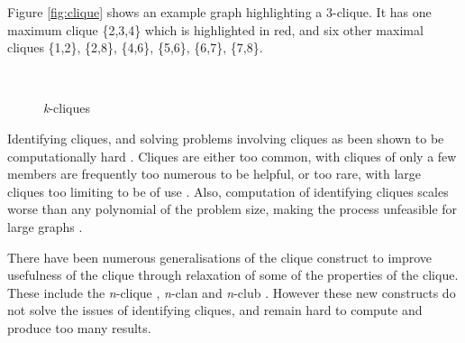 Figure \ref{fig:clique} shows an example graph highlighting a 3-clique. It has one maximum clique \{2,3,4\} which is highlighted in red, and six other maximal cliques \{1,2\}, \{2,8\}, \{4,6\}, \{5,6\}, \{6,7\}, \{7,8\}.

\begin{figure}
  \centering
   ~  ~ 
  \caption{\emph{k}-cliques}
  \label{fig:cliques}
\end{figure}

Identifying cliques, and solving problems involving cliques as been shown to be computationally hard \cite{bomze99, trusses}. Cliques are either too common, with cliques of only a few members are frequently too numerous to be helpful, or too rare, with large cliques too limiting to be of use \cite{trusses}. Also, computation of identifying cliques scales worse than any polynomial of the problem size, making the process unfeasible for large graphs \cite{trusses, bron72}.

There have been numerous generalisations of the clique construct to improve usefulness of the clique through relaxation of some of the properties of the clique. These include the \emph{n}-clique \cite{luce50}, \emph{n}-clan \cite{alba73} and \emph{n}-club \cite{mokken79}. However these new constructs do not solve the issues of identifying cliques, and remain hard to compute and produce too many results.

